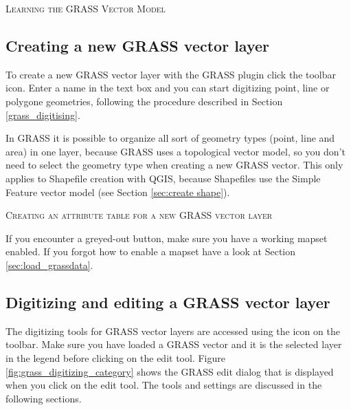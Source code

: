 \begin{Tip}\caption{\textsc{Learning the GRASS Vector Model}}
\end{Tip} 

\subsection{Creating a new GRASS vector layer}\label{sec:creating_new_grass_vectors}

To create a new GRASS vector layer with the GRASS plugin click the  toolbar icon. Enter a name in the text box and you can start digitizing point, line or polygone geometries, following the procedure described in Section \ref{grass_digitising}. 

In GRASS it is possible to organize all sort of geometry types (point, line and area) in one layer, because GRASS uses a topological vector model, so you don't need to select the geometry type when creating a new GRASS vector. This only applies to Shapefile creation with QGIS, because Shapefiles use the Simple Feature vector model (see Section \ref{sec:create shape}).

\begin{Tip}\caption{\textsc{Creating an attribute table for a new GRASS vector layer}}
\end{Tip} 

If you encounter a greyed-out button, make sure you have a working mapset enabled. If you forgot how to enable a mapset have a look at Section \ref{sec:load_grassdata}.

\subsection{Digitizing and editing a GRASS vector layer}\label{grass_digitising}

The digitizing tools for GRASS vector layers are accessed using the
 icon on the toolbar. Make sure you have loaded a GRASS vector and it is the selected layer in the legend before clicking on the edit tool. Figure \ref{fig:grass_digitizing_category} shows the GRASS edit dialog that is displayed when you click on the edit tool. The tools and settings are discussed in the following sections.

